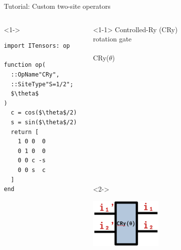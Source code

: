 \begin{frame}[fragile]{Tutorial: Custom two-site operators}

\begin{columns}

\begin{column}{5cm}

\begin{onlyenv}<1->

\begin{lstlisting}[language=JuliaLocal, style=julia, mathescape, basicstyle=\small]
import ITensors: op

function op(
  ::OpName"CRy",
  ::SiteType"S=1/2";
  $\theta$
)
  c = cos($\theta$/2)
  s = sin($\theta$/2)
  return [
    1 0 0  0
    0 1 0  0
    0 0 c -s
    0 0 s  c
  ]
end
\end{lstlisting}

\end{onlyenv}

\end{column}

\begin{column}{5cm}

\begin{onlyenv}<1-1>
Controlled-Ry (CRy) \\
rotation gate \\
~\\
CRy($\theta$) \\
~\\
~\\
~\\
~\\
~\\
~\\
~\\
~\\
~\\
~\\
~\\
~\\
\end{onlyenv}

\begin{onlyenv}<2->
\vspace*{0.0cm}
\begin{center}
\includegraphics[width=0.2\textwidth]{
  slides/assets/CRy12.png
}
\end{center}
\vspace*{0.0cm}
\end{onlyenv}

\end{column}

\end{columns}

\end{frame}
